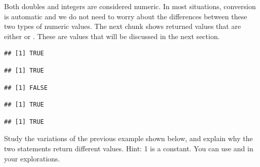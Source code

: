 \documentclass[krantz2]{krantz}\usepackage{knitr}
\begin{document}
Both doubles and integers are considered numeric. In most situations, conversion is automatic and we do not need to worry about the differences between these two types of numeric values. The next chunk shows returned values that are either  or . These are  values that will be discussed in the next section.

\begin{knitrout}\footnotesize
{}\color{fgcolor}\begin{kframe}
\begin{alltt}
\hlstd{(}\hlstd{)}
\end{alltt}
\begin{verbatim}
## [1] TRUE
\end{verbatim}
\begin{alltt}
\hlstd{(}\hlstd{)}
\end{alltt}
\begin{verbatim}
## [1] TRUE
\end{verbatim}
\begin{alltt}
\hlstd{(}\hlstd{)}
\end{alltt}
\begin{verbatim}
## [1] FALSE
\end{verbatim}
\begin{alltt}
\hlstd{(} \hlopt{/} \hlstd{)}
\end{alltt}
\begin{verbatim}
## [1] TRUE
\end{verbatim}
\begin{alltt}
\hlstd{(} \hlopt{/} \hlstd{)}
\end{alltt}
\begin{verbatim}
## [1] TRUE
\end{verbatim}
\end{kframe}
\end{knitrout}

\begin{advplayground}
Study the variations of the previous example shown below, and explain why the two statements return different values. Hint: 1 is a  constant. You can use  and  in your explorations.

\begin{knitrout}\footnotesize
{}\color{fgcolor}\begin{kframe}
\begin{alltt}
 \hlopt{*}  \hlopt{*} 
 \hlopt{*}  \hlopt{*} 
\end{alltt}
\end{kframe}
\end{knitrout}
\end{advplayground}
\end{document}
